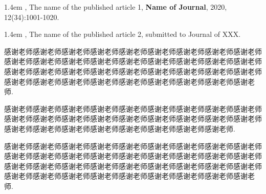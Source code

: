 \documentclass[master,print]{shnuthesis}
\begin{document}

\begin{researchpage}
\hangindent 1.4em
,  The name of the published article 1, {\bf  Name of Journal}, 2020, 12(34):1001-1020.

\hangindent 1.4em
, The name of the published article 2, submitted to
Journal of XXX.

\end{researchpage}




\begin{thankpage}
\setlength{\baselineskip}{24pt}

感谢老师感谢老师感谢老师感谢老师感谢老师感谢老师感谢老师感谢老师感谢老师感谢老师感谢老师感谢老师感谢老师感谢老师感谢老师感谢老师感谢老师感谢老师感谢老师感谢老师感谢老师感谢老师感谢老师感谢老师感谢老师感谢老师感谢老师感谢老师感谢老师感谢老师感谢老师感谢老师感谢老师感谢老师感谢老师感谢老师.

感谢老师感谢老师感谢老师感谢老师感谢老师感谢老师感谢老师感谢老师感谢老师感谢老师感谢老师感谢老师感谢老师感谢老师感谢老师感谢老师感谢老师感谢老师感谢老师感谢老师感谢老师感谢老师感谢老师感谢老师感谢老师感谢老师.

感谢老师感谢老师感谢老师感谢老师感谢老师感谢老师感谢老师感谢老师感谢老师感谢老师感谢老师感谢老师感谢老师感谢老师感谢老师感谢老师感谢老师感谢老师感谢老师感谢老师感谢老师感谢老师感谢老师感谢老师感谢老师感谢老师感谢老师感谢老师感谢老师感谢老师感谢老师感谢老师感谢老师感谢老师感谢老师感谢老师.


\end{thankpage}
\end{document}
